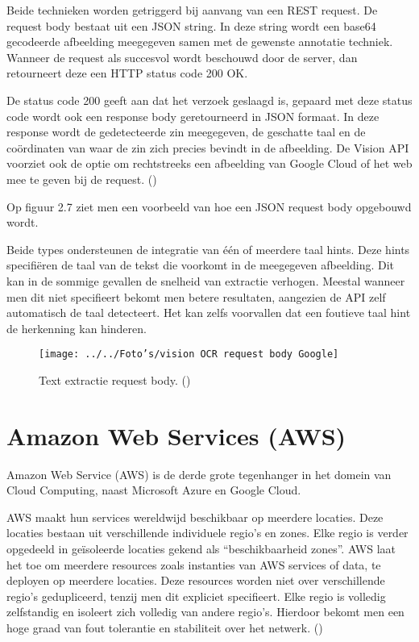 Beide technieken worden getriggerd bij aanvang van een REST request. De request body bestaat uit een JSON string. In deze string wordt een base64 gecodeerde afbeelding meegegeven samen met de gewenste annotatie techniek. Wanneer de request als succesvol wordt beschouwd door de server, dan retourneert deze een HTTP status code 200 OK. 


De status code 200 geeft aan dat het verzoek geslaagd is, gepaard met deze status code wordt ook een response body geretourneerd in JSON formaat. In deze response wordt de gedetecteerde zin meegegeven, de geschatte taal en de coördinaten van waar de zin zich precies bevindt in de afbeelding. De Vision API voorziet ook de optie om rechtstreeks een afbeelding van Google Cloud of het web mee te geven bij de request. (\cite{Google2020e}) 


Op figuur 2.7 ziet men een voorbeeld van hoe een JSON request body opgebouwd wordt. 


Beide types ondersteunen de integratie van één of meerdere taal hints. Deze hints specifiëren de taal van de tekst die voorkomt in de meegegeven afbeelding. Dit kan in de sommige gevallen de snelheid van extractie verhogen. Meestal wanneer men dit niet specifieert bekomt men betere resultaten, aangezien de API zelf automatisch de taal detecteert. Het kan zelfs voorvallen dat een foutieve taal hint de herkenning kan hinderen. 
\begin{figure}[h]
	\texttt{[image: ../../Foto's/vision OCR request body Google]}
		\captionsetup{justification=centering,margin=2cm}
	\caption{Text extractie request body. (\cite{Google2020e})}
	\centering
\end{figure}

\section{Amazon Web Services (AWS)}
Amazon Web Service (AWS) is de derde grote tegenhanger in het domein van Cloud Computing, naast Microsoft Azure en Google Cloud.  



AWS maakt hun services wereldwijd beschikbaar op meerdere locaties. Deze locaties bestaan uit verschillende individuele regio's en zones. Elke regio is verder opgedeeld in geïsoleerde locaties gekend als “beschikbaarheid zones”. AWS laat het toe om meerdere resources zoals instanties van AWS services of data, te deployen op meerdere locaties. Deze resources worden niet over verschillende regio's gedupliceerd, tenzij men dit expliciet specifieert. Elke regio is volledig zelfstandig en isoleert zich volledig van andere regio’s. Hierdoor bekomt men een hoge graad van fout tolerantie en stabiliteit over het netwerk. (\cite{Amazon2020a})



